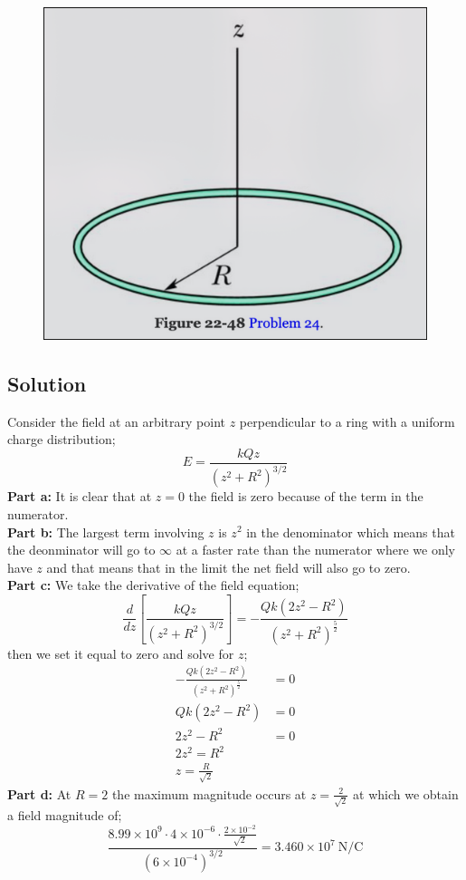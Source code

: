 \documentclass{article}
\newcommand{\N}{\text{N}}
\newcommand{\C}{\text{C}}
\begin{document}
\begin{figure}[ht]
    \centering
    \includegraphics[scale=0.4]{image-5.png}
\end{figure}

\subsection*{Solution}
Consider the field at an arbitrary point $z$ perpendicular to a ring with a uniform charge distribution;
\[
	E = \frac{kQz}{\left(z^2+R^2\right)^{3/2}}
\]
\textbf{Part a:} It is clear that at $z=0$ the field is zero because of the term in the numerator.\\
\textbf{Part b:} The largest term involving $z$ is $z^2$ in the denominator which means that the deonminator will go to $\infty$ at a faster rate than the numerator where we only have $z$ and that means that in the limit the net field will also go to zero.\\
\textbf{Part c:} We take the derivative of the field equation;
\[
	\frac{d}{dz} \left[ \frac{kQz}{\left(z^2+R^2\right)^{3/2}} \right] = -\frac{Qk \left(2z^{2} - R^{2}\right)}{\left(z^{2} + R^{2}\right)^{\frac{5}{2}}}\]
then we set it equal to zero and solve for $z$;
\begin{align*}
	-\frac{Qk \left(2z^{2} - R^{2}\right)}{\left(z^{2} + R^{2}\right)^{\frac{5}{2}}} &= 0 \\
	Qk \left(2z^{2} - R^{2}\right) &=0 \\
	2z^2 - R^2 &= 0 \\
	2z^2 = R^2 \\
	z = \frac{R}{\sqrt{2}}
\end{align*}
\textbf{Part d:} At $R=2$ the maximum magnitude occurs at $z = \frac{2}{\sqrt{2}}$ at which we obtain a field magnitude of;
\[
	\frac{8.99 \times 10^9 \cdot 4 \times 10^{-6} \cdot \frac{2 \times 10^{-2}}{\sqrt{2}}}{\left(6 \times 10^{-4}\right)^{3/2}} = \boxed{3.460 \times 10^7 \ \N/\C}
\]
\end{document}
